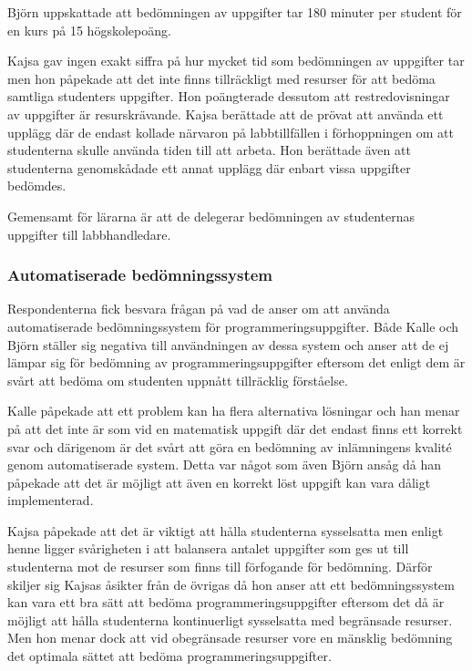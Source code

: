 \documentclass[a4paper,11pt]{article}
\begin{document}
{Björn uppskattade att bedömningen av uppgifter tar 180 minuter per student
för en kurs på 15 högskolepoäng. 

Kajsa gav ingen exakt siffra på hur mycket tid som bedömningen av uppgifter tar men hon påpekade att det inte finns tillräckligt med resurser för att bedöma samtliga studenters uppgifter. Hon poängterade dessutom att restredovisningar av uppgifter är resurskrävande. Kajsa berättade att de prövat att använda ett upplägg där de endast kollade närvaron på labbtillfällen i förhoppningen om att studenterna skulle använda tiden till att arbeta. Hon berättade även att studenterna genomskådade ett annat upplägg där enbart vissa uppgifter bedömdes.

Gemensamt för lärarna är att de delegerar bedömningen av studenternas uppgifter till labbhandledare. 

\subsubsection{Automatiserade bedömningssystem}

Respondenterna fick besvara frågan på vad de anser om att använda automatiserade bedömningssystem för programmeringsuppgifter. Både Kalle och Björn ställer sig negativa till användningen av dessa system och anser att de ej lämpar sig för bedömning av programmeringsuppgifter eftersom det enligt dem är svårt att bedöma om studenten uppnått tillräcklig förståelse.

Kalle påpekade att ett problem kan ha flera alternativa lösningar och han menar på att det inte är som vid en matematisk uppgift där det endast finns ett korrekt svar och därigenom är det svårt att göra en bedömning av inlämningens kvalité genom automatiserade system. Detta var något som även Björn ansåg då han påpekade att det är möjligt att även en korrekt löst uppgift kan vara dåligt implementerad.

Kajsa påpekade att det är viktigt att hålla studenterna sysselsatta men enligt henne ligger svårigheten i att balansera antalet uppgifter som ges ut till studenterna mot de resurser som finns till förfogande för bedömning. Därför skiljer sig Kajsas åsikter från de övrigas då hon anser att ett bedömningssystem kan vara ett bra sätt att bedöma programmeringsuppgifter eftersom det då är möjligt att hålla studenterna kontinuerligt sysselsatta med begränsade resurser. Men hon menar dock att vid obegränsade resurser vore en mänsklig bedömning det optimala sättet att bedöma programmeringsuppgifter.

}
\end{document}
